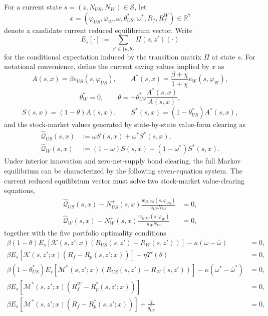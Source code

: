 \documentclass{article}
\begin{document}
For a current state $s=(z,N_{US},N_W)\in\mathcal S$, let
\[
x=(\varphi_{US},\varphi_W,\omega,\theta_{US}^*,\omega^*,R_f,R_f^W)\in\mathbb R^7
\]
denote a candidate current reduced equilibrium vector. Write
\[
E_s[\cdot]:=\sum_{z'\in\{u,b\}}\Pi(z,z')(\cdot)
\]
for the conditional expectation induced by the transition matrix $\Pi$ at state $s$. For notational convenience, define the current saving values implied by $x$ as
\[
A(s,x)=\beta e_{US}(s,\varphi_{US}),
\qquad
A^*(s,x)=\frac{\beta+\chi}{1+\chi}e_W(s,\varphi_W),
\]
\[
\theta_W^*=0,
\qquad
\theta=-\theta_{US}^*\frac{A^*(s,x)}{A(s,x)},
\]
\[
S(s,x)=(1-\theta)A(s,x),
\qquad
S^*(s,x)=(1-\theta_{US}^*)A^*(s,x),
\]
and the stock-market values generated by state-by-state value-form clearing as
\begin{align}
\widehat{\mathcal Q}_{US}(s,x)
&:=\omega S(s,x)+\omega^*S^*(s,x),
\label{intratemporal_QUS}\\
\widehat{\mathcal Q}_{W}(s,x)
&:=(1-\omega)S(s,x)+(1-\omega^*)S^*(s,x).
\label{intratemporal_QW}
\end{align}
Under interior innovation and zero-net-supply bond clearing, the full Markov equilibrium can be characterized by the following seven-equation system. The current reduced equilibrium vector must solve two stock-market value-clearing equations,
\begin{align}
\widehat{\mathcal Q}_{US}(s,x)
-
N_{US}^+(s,x)\frac{w_{H,US}(s,\varphi_{US})}{a_{US}N_{US}}
&=0,
\label{intratemporal_phi_US}\\
\widehat{\mathcal Q}_{W}(s,x)
-
N_W^+(s,x)\frac{w_{H,W}(s,\varphi_W)}{a_WN_W}
&=0,
\label{intratemporal_phi_W}
\end{align}
together with the five portfolio optimality conditions
\begin{align}
\beta(1-\theta)
E_s\!\left[\mathcal K(s,z';x)
(R_{US}(s,z')-R_W(s,z'))\right]
-\kappa(\omega-\bar\omega)&=0,
\label{intratemporal_omega_US}\\
\beta
E_s\!\left[\mathcal K(s,z';x)
(R_f-R_p(s,z';x))\right]
-\eta\Upsilon'(\theta)&=0,
\label{intratemporal_theta_US}\\
\beta(1-\theta_{US}^*)
E_s\!\left[\mathcal M^*(s,z';x)
(R_{US}(s,z')-R_W(s,z'))\right]
-\kappa(\omega^*-\bar\omega^*)&=0,
\label{intratemporal_omega_W}\\
\beta E_s\!\left[\mathcal M^*(s,z';x)
(R_f^W-R_p^*(s,z';x))\right]&=0,
\label{intratemporal_thetaW}\\
\beta E_s\!\left[\mathcal M^*(s,z';x)
(R_f-R_p^*(s,z';x))\right]
+\frac{\chi}{\theta_{US}^*}&=0,
\label{intratemporal_thetaUS}
\end{align}
\end{document}
